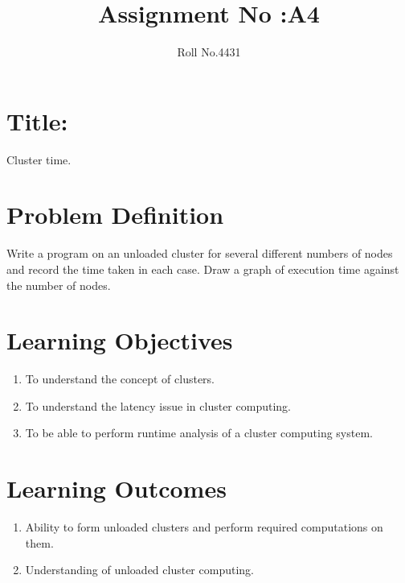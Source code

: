 \documentclass[10pt,a4paper]{article}
\title{Assignment No :A4}
\date{}
\author{Roll No.4431}
\begin{document}
\maketitle
\section{Title:}
Cluster time.

\section{Problem Definition}
Write a program on an unloaded cluster for several different numbers of nodes and record the time taken in each case. Draw a graph of execution time against the number of nodes.

\section{Learning Objectives}
\begin{enumerate}
\item To understand the concept of clusters.
\item To understand the latency issue in cluster computing.
\item To be able to perform runtime analysis of a cluster computing system.
\end{enumerate}

\section{Learning Outcomes}
\begin{enumerate}
\item Ability to form unloaded clusters and perform required computations on them.
\item Understanding of unloaded cluster computing.
\end{enumerate}
\end{document}
